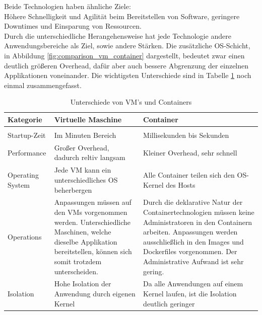 Beide Technologien haben ähnliche Ziele: \\
Höhere Schnelligkeit und Agilität beim Bereitstellen von Software, geringere Downtimes und Einsparung von Ressourcen. \\
Durch die unterschiedliche Herangehensweise hat jede Technologie andere Anwendungsbereiche als Ziel, sowie andere Stärken.
Die zusätzliche \ac{OS}-Schicht, in Abbildung \ref{fig:comparison_vm_container} dargestellt, bedeutet zwar einen deutlich größeren Overhead, dafür aber auch bessere Abgrenzung der einzelnen Applikationen voneinander.
Die wichtigsten Unterschiede sind in Tabelle \ref{table:comparison_vm_container} noch einmal zusammengefasst. 

\begin{table}[ht]
        \centering
        \begin{tabular}{ | p{} | p{} | p{} | }
        Kategorie & Virtuelle Maschine & Container \\
        \hline \\
        Startup-Zeit & Im Minuten Bereich & Millisekunden bis Sekunden \\
        Performance & Großer Overhead, dadurch reltiv langsam & Kleiner Overhead, sehr schnell\\
        Operating System & Jede \ac{VM} kann ein unterschiedliches \ac{OS} beherbergen & Alle Container teilen sich den \ac{OS}-Kernel des Hosts \\
        Operations & Anpassungen müssen auf den \ac{VM}s vorgenommen werden. Unterschiedliche Maschinen, welche dieselbe Applikation bereitstellen, können sich somit trotzdem unterscheiden. & Durch die deklarative Natur der Containertechnologien müssen keine Administratoren in den Containern arbeiten. Anpassungen werden ausschließlich in den Images und Dockerfiles vorgenommen. Der Administrative Aufwand ist sehr gering. \\
        Isolation & Hohe Isolation der Anwendung durch eigenen Kernel & Da alle Anwendungen auf einem Kernel laufen, ist die Isolation deutlich geringer \\
        \end{tabular}
        \caption{Unterschiede von VM's und Containers}
        \label{table:comparison_vm_container}
\end{table}


